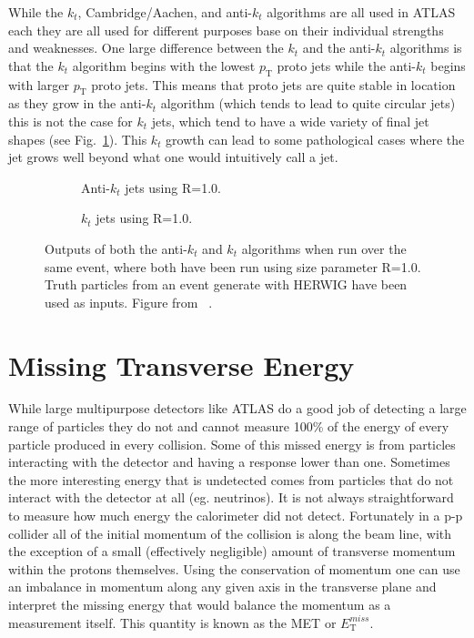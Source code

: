 While the $k_t$, Cambridge/Aachen, and anti-$k_t$ algorithms are all used in ATLAS each they are all used for different purposes base on their individual strengths and weaknesses.  
One large difference between the $k_t$ and the anti-$k_t$ algorithms is that the $k_t$ algorithm begins with the lowest $p_{\mathrm T}$ proto jets while the anti-$k_t$ begins with larger $p_{\mathrm T}$ proto jets.  
This means that proto jets are quite stable in location as they grow in the anti-$k_t$ algorithm (which tends to lead to quite circular jets) this is not the case for $k_t$ jets, which tend to have a wide variety of final jet shapes (see Fig.~\ref{Fig:ExampleJets}).  
This $k_t$ growth can lead to some pathological cases where the jet grows well beyond what one would intuitively call a jet.  

\begin{figure}[!ht]
 \centering
 \begin{subfigure}{.5\textwidth}
  \centering
  \caption{Anti-$k_t$ jets using R=1.0.}
 \end{subfigure}%
 \begin{subfigure}{.5\textwidth}
  \centering
  \caption{$k_t$ jets using R=1.0.}
 \end{subfigure}
 \caption[Comparing differnet jet building algorithms.]
  {Outputs of both the anti-$k_t$ and $k_t$ algorithms when run over the same event, where both have been run using size parameter R=1.0.  Truth particles from an event generate with HERWIG have been used as inputs.  Figure from ~\cite{Cacciari:2008gp}. }
 \label{Fig:ExampleJets}
\end{figure}



\section{Missing Transverse Energy}

While large multipurpose detectors like ATLAS do a good job of detecting a large range of particles they do not and cannot measure 100\% of the energy of every particle produced in every collision.  
Some of this missed energy is from particles interacting with the detector and having a response lower than one.  
Sometimes the more interesting energy that is undetected comes from particles that do not interact with the detector at all (eg. neutrinos).  
It is not always straightforward to measure how much energy the calorimeter did not detect.  
Fortunately in a p-p collider all of the initial momentum of the collision is along the beam line, with the exception of a small (effectively negligible) amount of transverse momentum within the protons themselves.  
Using the conservation of momentum one can use an imbalance in momentum along any given axis in the transverse plane and interpret the missing energy that would balance the momentum as a measurement itself.  
This quantity is known as the \gls{MET} or $E_{\mathrm T}^{miss}$.  


